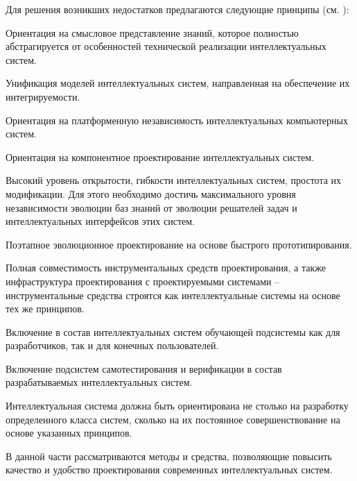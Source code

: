 \begin{partbacktext}
Для решения возникших недостатков предлагаются следующие принципы (см. ):
\begin{textitemize}
	\item{Ориентация на смысловое представление знаний, которое полностью абстрагируется от
		особенностей технической реализации интеллектуальных систем.}
	\item{Унификация моделей интеллектуальных систем, направленная на обеспечение их
		интегрируемости.}
	\item{Ориентация на платформенную независимость интеллектуальных компьютерных систем.}
	\item{Ориентация на компонентное проектирование интеллектуальных систем.}
	\item{Высокий уровень открытости, гибкости интеллектуальных систем, простота их модификации. Для этого необходимо достичь максимального уровня независимости эволюции баз знаний от эволюции решателей задач и интеллектуальных интерфейсов этих систем.}
	\item{Поэтапное эволюционное проектирование на основе быстрого прототипирования.}
	\item{Полная совместимость инструментальных средств проектирования, а также инфраструктура проектирования с проектируемыми системами – инструментальные средства строятся как интеллектуальные системы на основе тех же принципов.}
	\item{Включение в состав интеллектуальных систем обучающей подсистемы как для разработчиков, так и для конечных пользователей.}
	\item{Включение подсистем самотестирования и верификации в состав разрабатываемых интеллектуальных систем.}
\end{textitemize}

Интеллектуальная система должна быть ориентирована не столько на разработку определенного класса систем, сколько на их постоянное совершенствование  на основе указанных принципов.

В данной части рассматриваются методы и средства, позволяющие повысить качество и удобство проектирования современных интеллектуальных систем.
\end{partbacktext}




